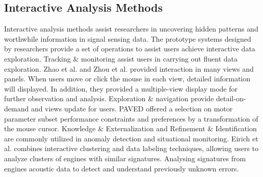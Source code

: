 \documentclass[a4paper,fleqn]{cas-dc}
\begin{document}
\subsection{Interactive Analysis Methods}
Interactive analysis methods assist researchers in uncovering hidden patterns \cite{narechania2020safetylens} and worthwhile information \cite{eirich2021irvine} in signal sensing data.
The prototype systems \cite{eirich2021irvine, zhao2019visual, Zhou2018} designed by researchers provide a set of operations to assist users achieve interactive data exploration. 
Tracking \& monitoring assist users in carrying out fluent data exploration.
Zhao et al. \cite{zhao2019visual} and Zhou et al. \cite{Zhou2018} provided interaction in many views and panels. When users move or click the mouse in each view, detailed information will displayed. In addition, they provided a multiple-view display mode for further observation and analysis. 
Exploration \& navigation provide detail-on-demand and views update for users.
PAVED \cite{cibulski2020paved} offered a selection on motor parameter subset performance constraints and preferences by a transformation of the mouse cursor.
Knowledge \& Externalization and Refinement \& Identification are commonly utilized in anomaly detection and situational monitoring.
Eirich et al. \cite{eirich2021irvine} combines interactive clustering and data labeling techniques, allowing users to analyze clusters of engines with similar signatures. Analysing signatures from engines acoustic data to detect and understand previously unknown errors.

\end{document}
